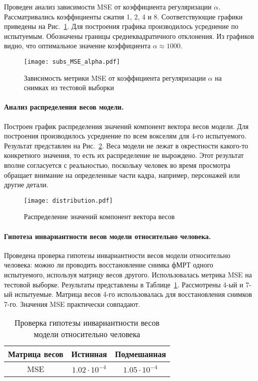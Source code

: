 \documentclass[a4paper, 12pt]{extarticle}
\begin{document}
Проведен анализ зависимости MSE от коэффициента регуляризации $\alpha$.
Рассматривались коэффициенты сжатия 1, 2, 4 и 8.
Соответствующие графики приведены на Рис.~\ref{fig:mse-alpha}.
Для построения графика производилось усреднение по испытуемым.
Обозначены границы среднеквадратичного отклонения.
Из графиков видно, что оптимальное значение коэффициента $\alpha \approx 1000$.

\begin{figure}[h!]
	\centering
	\texttt{[image: subs\_MSE\_alpha.pdf]}
	\caption{Зависимость метрики MSE от коэффициента регуляризации $\alpha$ на снимках из тестовой выборки}
	\label{fig:mse-alpha}
\end{figure}

\paragraph*{Анализ распределения весов модели.}

Построен график распределения значений компонент вектора весов модели.
Для построения производилось усреднение по всем вокселям для 4-го испытуемого.
Результат представлен на Рис.~\ref{fig:w-distr}.
Веса модели не лежат в окрестности какого-то конкретного значения, 
то есть их распределение не вырождено.
Этот результат вполне согласуется с реальностью, поскольку человек во время просмотра
обращает внимание на определенные части кадра, например, персонажей или
другие детали.

\begin{figure}[h!]
	\centering
	\texttt{[image: distribution.pdf]}
	\caption{Распределение значений компонент вектора весов}
	\label{fig:w-distr}
\end{figure}

\paragraph*{Гипотеза инвариантности весов модели относительно человека.}

Проведена проверка гипотезы инвариантности весов модели относительно человека:
можно ли проводить восстановление снимка фМРТ одного испытуемого, используя
матрицу весов другого. Использовалась метрика MSE на тестовой выборке.
Результаты представлены в Таблице~\ref{table:inv}.
Рассмотрены 4-ый и 7-ый испытуемые. Матрица весов 4-го использовалась для восстановления
снимков 7-го.
Значения MSE практически совпадают. 

\begin{table}[h!]
	\centering
	\caption{Проверка гипотезы инвариантности весов модели относительно человека}
	\begin{tabular}{|c|c|c|}
		\hline
		Матрица весов & Истинная             & Подмешанная          \\ \hline \hline
		MSE           & $1.02 \cdot 10^{-4}$ & $1.05 \cdot 10^{-4}$ \\ \hline
	\end{tabular}
	\label{table:inv}
\end{table}
\end{document}

